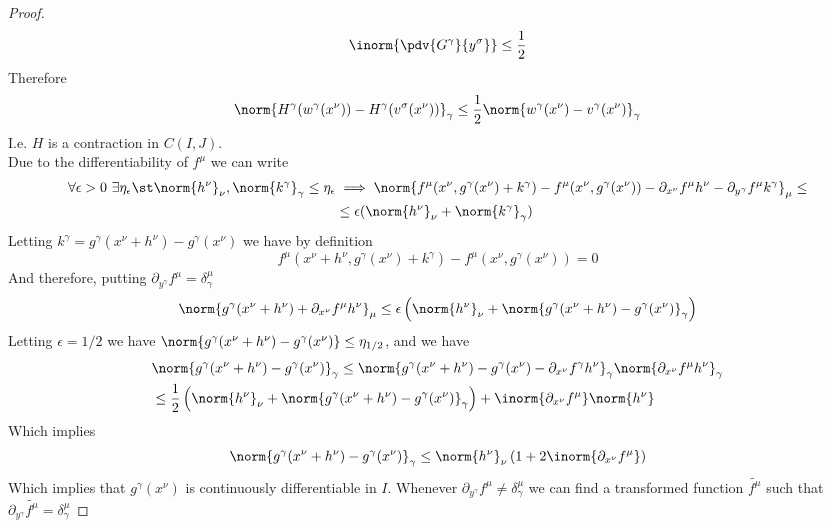 \documentclass[../mmf.tex]{subfiles}
\begin{document}
\begin{proof}
	\begin{equation*}
		\inorm{\pdv{G^\gamma}{y^\sigma}}\le\frac{1}{2}
	\end{equation*}
	Therefore
	\begin{equation*}
		\norm{H^\gamma(w^\gamma(x^\nu))-H^\gamma(v^\sigma(x^\nu))}_\gamma\le\frac{1}{2}\norm{w^\gamma(x^\nu)-v^\gamma(x^\nu)}_\gamma
	\end{equation*}
	I.e. $H$ is a contraction in $C(I,J)$.\\
	Due to the differentiability of $f^\mu$ we can write
	\begin{equation*}
		\begin{aligned}
			\forall\epsilon>0\ \exists\eta_\epsilon\st\norm{h^\nu}_\nu,\norm{k^\gamma}_\gamma\le\eta_\epsilon&\implies{}\norm{f^\mu(x^\nu,g^\gamma(x^\nu)+k^\gamma)-f^\mu(x^\nu,g^\gamma(x^\nu))-\partial_{x^\nu}f^\mu h^\nu-\partial_{y^\gamma}f^\mu k^\gamma}_\mu\le\\
			&\le\epsilon(\norm{h^\nu}_\nu+\norm{k^\gamma}_\gamma)
		\end{aligned}
	\end{equation*}
	Letting $k^\gamma=g^\gamma(x^\nu+h^\nu)-g^\gamma(x^\nu)$ we have by definition
	\begin{equation*}
		f^\mu(x^\nu+h^\nu,g^\gamma(x^\nu)+k^\gamma)-f^\mu(x^\nu,g^\gamma(x^\nu))=0
	\end{equation*}
	And therefore, putting $\partial_{y^\gamma}f^\mu=\delta^\mu_\gamma$
	\begin{equation*}
		\norm{g^\gamma(x^\nu+h^\nu)+\partial_{x^\nu}f^\mu h^\nu}_\mu\le\epsilon\left( \norm{h^\nu}_\nu+\norm{g^\gamma(x^\nu+h^\nu)-g^\gamma(x^\nu)}_\gamma \right)
	\end{equation*}
	Letting $\epsilon=1/2$ we have $\norm{g^\gamma(x^\nu+h^\nu)-g^\gamma(x^\nu)}\le\eta_{1/2}$, and we have
	\begin{equation*}
		\begin{aligned}
			&\norm{g^\gamma(x^\nu+h^\nu)-g^\gamma(x^\nu)}_\gamma\le\norm{g^\gamma(x^\nu+h^\nu)-g^\gamma(x^\nu)-\partial_{x^\nu}f^\gamma h^\nu}_\gamma\norm{\partial_{x^\nu}f^\mu h^\nu}_\gamma\\
			&\le\frac{1}{2}\left( \norm{h^\nu}_\nu+\norm{g^\gamma(x^\nu+h^\nu)-g^\gamma(x^\nu)}_\gamma \right)+\inorm{\partial_{x^\nu}f^\mu}\norm{h^\nu}
		\end{aligned}
	\end{equation*}
	Which implies
	\begin{equation*}
		\norm{g^\gamma(x^\nu+h^\nu)-g^\gamma(x^\nu)}_\gamma\le\norm{h^\nu}_\nu\left( 1+2\inorm{\partial_{x^\nu}f^\mu} \right)
	\end{equation*}
	Which implies that $g^\gamma(x^\nu)$ is continuously differentiable in $I$. Whenever $\partial_{y^\gamma}f^\mu\ne\delta^\mu_\gamma$ we can find a transformed function $\tilde{f^\mu}$ such that $\partial_{y^\gamma}\tilde{f^\mu}=\delta^\mu_\gamma$
\end{proof}
\end{document}
